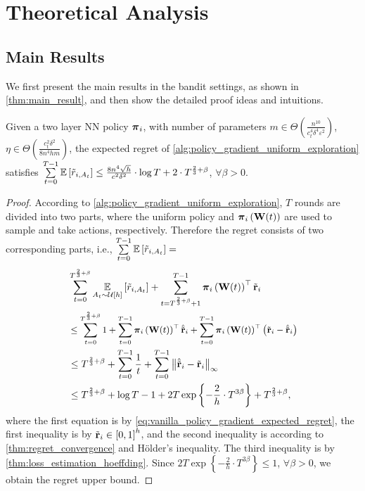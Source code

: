 \section{Theoretical Analysis}
\label{sec:theoretical_analysis}

\subsection{Main Results}
\label{subsec:main_results}

We first present the main results in the bandit settings, as shown in \cref{thm:main_result}, and then show the detailed proof ideas and  intuitions.

\begin{thm}
\label{thm:main_result}
    Given a two layer NN policy ${\boldsymbol{\pi}}_i$, with number of parameters $m \in \Theta\left( \frac{n^{10}}{c_t^4 \delta^4 \varepsilon^2} \right)$, $\eta \in \Theta\left( \frac{c_t^2 \delta^2}{8 n^4 h m} \right)$, the expected regret of \cref{alg:policy_gradient_uniform_exploration} satisfies $\sum\limits_{t=0}^{T-1}{ {\mathbb{E}} \left[ \tilde{r}_{i, A_t} \right] } \le  \frac{8 n^4 \sqrt{h}}{c^2 \delta^2} \cdot \log{T} + 2 \cdot T^{\frac{2}{3} + \beta }$, $\forall \beta > 0$.
\end{thm}
\begin{proof}
According to \cref{alg:policy_gradient_uniform_exploration}, $T$ rounds are divided into two parts, where the uniform policy and ${\boldsymbol{\pi}}_i\left( {\mathbf{W}}(t) \right)$ are used to sample and take actions, respectively. Therefore the regret consists of two corresponding parts, i.e., $\sum\limits_{t=0}^{T-1}{ {\mathbb{E}} \left[ \tilde{r}_{i, A_t} \right] } =$
\begin{equation*}
\begin{split}
     &\sum\limits_{t=0}^{T^{\frac{2}{3} + \beta}}{ \expectation\limits_{A_t \sim \gU\left[h\right]}{ \left[ \tilde{r}_{i, A_t} \right] }} + \sum\limits_{t=T^{\frac{2}{3} + \beta} + 1}^{T-1}{ \rvpi_i\left( \rmW(t) \right)^\top \rvtilder_i } \\
     &\le \small{\sum\limits_{t=0}^{T^{\frac{2}{3} + \beta}}{ 1 } + \sum\limits_{t=0}^{T-1}{ \rvpi_i\left( \rmW(t) \right)^\top \hat{\rvtilder}_i } + \sum\limits_{t=0}^{T-1}{ \rvpi_i\left( \rmW(t) \right)^\top \left( \rvtilder_i -  \hat{\rvtilder}_i \right) } } \\
     &\le T^{\frac{2}{3} + \beta } + \sum\limits_{t=0}^{T-1}{ \frac{1}{t} } + \sum\limits_{t=0}^{T-1}{ \left\| \hat{\rvtilder}_i - \rvtilder_i \right\|_\infty } \\
     &\le T^{\frac{2}{3} + \beta } + \log{T} - 1 + 2 T \exp\left\{ - \frac{2}{h} \cdot  T^{3\beta} \right\} + T^{\frac{2}{3} + \beta},
\end{split}
\end{equation*}
where the first equation is by \cref{eq:vanilla_policy_gradient_expected_regret}, the first inequality is by ${\tilde{\mathbf{r}}}_i \in \left[ 0, 1\right]^h$, and the second inequality is according to \cref{thm:regret_convergence} and H{\"o}lder's inequality. The third inequality is by \cref{thm:loss_estimation_hoeffding}. Since $2 T \exp\left\{ - \frac{2}{h} \cdot  T^{3\beta} \right\} \le 1$, $\forall \beta > 0$, we obtain the regret upper bound.
\end{proof}

